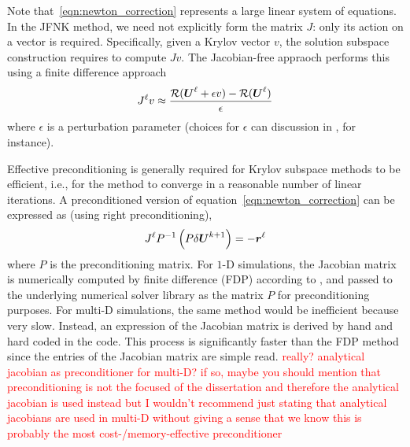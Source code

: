 Note that~\eqref{eqn:newton_correction} represents a large
linear system of equations.  In the JFNK method, we need not
explicitly form the matrix $J$: only its action on a vector is required. Specifically, given a Krylov vector $v$, the solution subspace construction requires to compute $Jv$. The Jacobian-free appraoch performs this using a finite difference approach
\begin{equation}
J^\ell v \approx \frac{ \mathcal{R} (\boldsymbol U^\ell + \epsilon v) - \mathcal{R} (\boldsymbol U^\ell)}{\epsilon}
\end{equation}
where $\epsilon$ is a perturbation parameter (choices for $\epsilon$ can discussion in \cite{Knoll_2004}, for instance).

Effective preconditioning is generally required for Krylov subspace
methods to be efficient, i.e., for the method to converge in a
reasonable number of linear iterations. A preconditioned version of
equation~\eqref{eqn:newton_correction} can be expressed as (using
right preconditioning),
\begin{equation}
  \label{eqn:newton_correction_preconditioned}
  J^\ell P^{-1} \left(P \delta \boldsymbol U^{k+1} \right)= -\boldsymbol r^\ell
\end{equation}
where $P$ is the preconditioning matrix. For $1$-D simulations, the Jacobian matrix is numerically computed by finite difference (FDP) according to , and passed to the underlying numerical solver
library as the matrix $P$ for preconditioning purposes. For multi-D simulations, the same method would be inefficient because very slow. Instead, an expression of the Jacobian matrix is derived by hand and hard coded in the code. This process is significantly faster than the FDP method since the entries of the Jacobian matrix are simple read.
 \textcolor{red}{really? analytical jacobian as preconditioner for multi-D? if so, maybe you should mention that preconditioning is not the focused of the dissertation and therefore the analytical jacobian is used instead but I wouldn't recommend just stating that analytical jacobians are used in multi-D without giving a sense that we know this is probably the most cost-/memory-effective preconditioner} 

